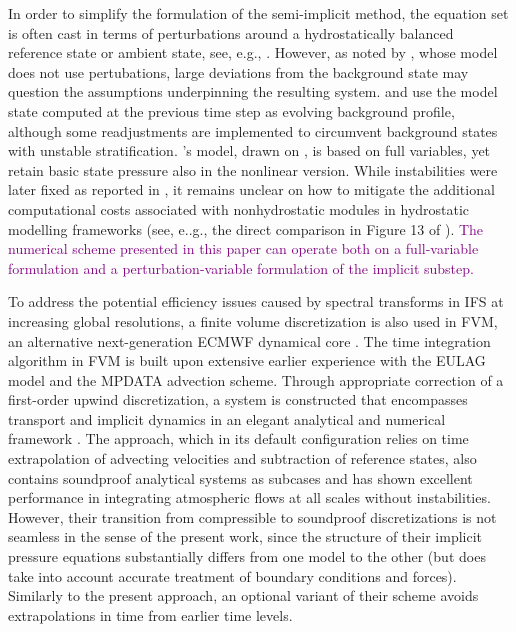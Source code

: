 \documentclass{ametsoc}
\newcommand{\purple}[1]{\textcolor{purple}{#1}}
\newcommand{\sblue}[1]{\textcolor{sblue}{#1}}
\newcommand{\tommaso}[1]{\purple{#1}}
\newcommand{\revision}[1]{\sblue{#1}}
\theoremstyle{definition}
\begin{document}
In order to simplify the formulation of the semi-implicit method, the equation set is often cast in terms of perturbations around a hydrostatically balanced reference state \revision{or ambient state}, see, e.g., \cite{RestelliGiraldo2009,SmolarkiewiczEtAl2014,SmolarkiewiczEtAl2019}. However, as noted by \cite{WellerShahrokhi2014}, whose model does not use pertubations, large deviations from the background state may question the assumptions underpinning the resulting system. \cite{WoodEtAl2013} and \cite{MelvinEtAl2018} use the model state computed at the previous time step as evolving background profile, \revision{although some readjustments are implemented to circumvent background states with unstable stratification}. \revision{\cite{BubnovaEtAl1995}'s model, drawn on \cite{Laprise1992}, is based on full variables, yet retain basic state pressure also in the nonlinear version. While instabilities were later fixed as reported in \cite{BenardEtAl2010}, it remains unclear on how to mitigate the additional computational costs associated with nonhydrostatic modules in hydrostatic modelling frameworks (see, e..g., the direct comparison in Figure 13 of \cite{KuehnleinEtAl2019}).} \tommaso{The numerical scheme presented in this paper can operate both on a full-variable formulation and a perturbation-variable formulation of the implicit substep.}

To address the potential efficiency issues caused by spectral transforms in IFS at increasing global resolutions, a finite volume discretization is also used in FVM, an alternative next-generation ECMWF dynamical core \citep{KuehnleinEtAl2019}. The time integration algorithm in FVM is built upon extensive earlier experience with the EULAG model and the MPDATA advection scheme. Through appropriate correction of a first-order upwind discretization, a system is constructed that encompasses transport and implicit dynamics in an elegant analytical and numerical framework \citep[and references therein]{SmolarkiewiczEtAl2014, SmolarkiewiczEtAl2016}. The approach, which in its default configuration relies on time extrapolation of advecting velocities and subtraction of reference states, also contains soundproof analytical systems as subcases and has shown excellent performance in integrating atmospheric flows at all scales without instabilities. However, their transition from compressible to soundproof discretizations is not seamless in the sense of the present work, since the structure of their implicit pressure equations substantially differs from one model to the other (but does take into account accurate treatment of boundary conditions and forces). Similarly to the present approach, an optional variant of their scheme avoids extrapolations in time from earlier time levels.
\end{document}
